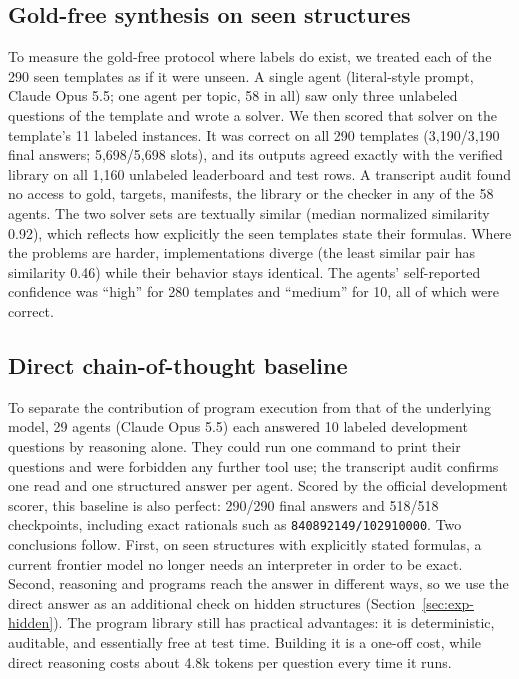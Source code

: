 \documentclass[conference]{IEEEtran}
\begin{document}
\subsection{Gold-free synthesis on seen structures}\label{sec:exp-zs}
To measure the gold-free protocol where labels do exist, we treated each of the 290 seen templates as if it were
unseen. A single agent (literal-style prompt, Claude Opus 5.5; one agent per topic, 58 in all) saw only three unlabeled
questions of the template and
wrote a solver. We then scored that solver on the template's 11 labeled instances. It was correct on all 290 templates
(3{,}190/3{,}190 final answers; 5{,}698/5{,}698 slots), and its outputs agreed exactly with the verified library on all
1{,}160 unlabeled leaderboard and test rows. A transcript audit found no access to gold, targets, manifests, the
library or the checker in any of the 58 agents. The two solver sets are textually similar (median normalized
similarity 0.92), which reflects how explicitly the seen templates state their formulas. Where the problems are
harder, implementations diverge (the least similar pair has similarity 0.46) while their behavior stays identical.
The agents' self-reported confidence was ``high'' for 280 templates and ``medium'' for 10, all of which were correct.

\subsection{Direct chain-of-thought baseline}\label{sec:exp-cot}
To separate the contribution of program execution from that of the underlying model, 29 agents (Claude Opus 5.5)
each answered 10 labeled development questions by reasoning alone. They could run one command to print their questions
and were forbidden any further tool use; the transcript audit confirms one read and one structured answer per agent.
Scored by the official development scorer, this baseline is also perfect: 290/290 final answers and 518/518 checkpoints,
including exact rationals such as \texttt{840892149/102910000}. Two conclusions follow. First, on seen structures with
explicitly stated formulas, a current frontier model no longer needs an interpreter in order to be exact. Second,
reasoning and programs reach the
answer in different ways, so we use the direct answer as an additional check on hidden structures
(Section~\ref{sec:exp-hidden}). The program library still has practical advantages: it is deterministic, auditable,
and essentially free at test time. Building it is a one-off cost, while direct reasoning costs about 4.8k
tokens per question every time it runs.
\end{document}
